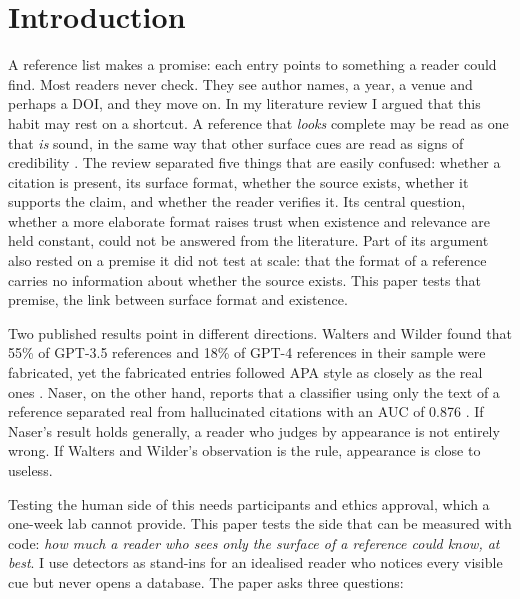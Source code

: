 \documentclass[acmsmall,nonacm]{acmart}
\begin{document}
\maketitle

\section{Introduction}

A reference list makes a promise: each entry points to something a reader could find. Most readers never check. They see author names, a year, a venue and perhaps a DOI, and they move on. In my literature review \cite{sabri2026review} I argued that this habit may rest on a shortcut. A reference that \emph{looks} complete may be read as one that \emph{is} sound, in the same way that other surface cues are read as signs of credibility \cite{metzger2013,newman2012}. The review separated five things that are easily confused: whether a citation is present, its surface format, whether the source exists, whether it supports the claim, and whether the reader verifies it. Its central question, whether a more elaborate format raises trust when existence and relevance are held constant, could not be answered from the literature. Part of its argument also rested on a premise it did not test at scale: that the format of a reference carries no information about whether the source exists. This paper tests that premise, the link between surface format and existence.

Two published results point in different directions. Walters and Wilder found that 55\% of GPT-3.5 references and 18\% of GPT-4 references in their sample were fabricated, yet the fabricated entries followed APA style as closely as the real ones \cite{walters2023}. Naser, on the other hand, reports that a classifier using only the text of a reference separated real from hallucinated citations with an AUC of 0.876 \cite{naser2026}. If Naser's result holds generally, a reader who judges by appearance is not entirely wrong. If Walters and Wilder's observation is the rule, appearance is close to useless.

Testing the human side of this needs participants and ethics approval, which a one-week lab cannot provide. This paper tests the side that can be measured with code: \emph{how much a reader who sees only the surface of a reference could know, at best}. I use detectors as stand-ins for an idealised reader who notices every visible cue but never opens a database. The paper asks three questions:
\end{document}
